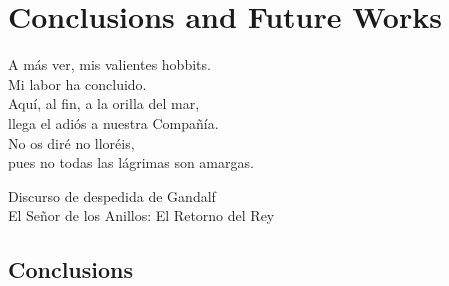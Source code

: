 % 
% 
% 
% 
% 
% 
% 

\chapter{Conclusions and Future Works}
\label{cha:conclusions_and_future_works}

\begin{FraseCelebre}
	\begin{Frase}
		A más ver, mis valientes hobbits. \\
		Mi labor ha concluido. \\
		Aquí, al fin, a la orilla del mar, \\
		llega el adiós a nuestra Compañía. \\
		No os diré no lloréis, \\
		pues no todas las lágrimas son amargas.
	\end{Frase}
	\begin{Fuente}
		Discurso de despedida de Gandalf \\
		El Señor de los Anillos: El Retorno del Rey
	\end{Fuente}
\end{FraseCelebre}

\section{Conclusions}
\label{sec:9_conclusions}


